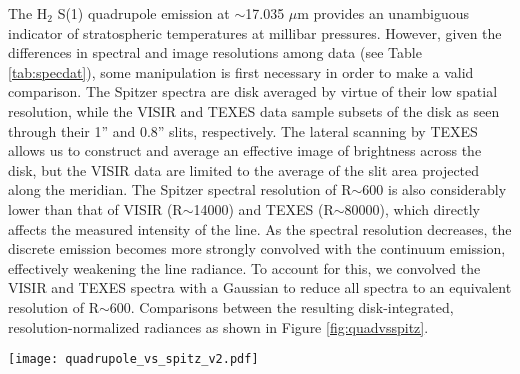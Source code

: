 \documentclass[twocolumn,10pt]{aastex631}
\begin{document}
The H$_2$ S(1) quadrupole emission at $\sim$17.035 $\mu$m provides an unambiguous indicator of stratospheric temperatures at millibar pressures.  However, given the differences in spectral and image resolutions among data (see Table \ref{tab:specdat}), some manipulation is first necessary in order to make a valid comparison. The Spitzer spectra are disk averaged by virtue of their low spatial resolution, while the VISIR and TEXES data sample subsets of the disk as seen through their 1'' and 0.8'' slits, respectively. The lateral scanning by TEXES allows us to construct and average an effective image of brightness across the disk, but the VISIR data are limited to the average of the slit area projected along the meridian. The Spitzer spectral resolution of R$\sim$600 is also considerably lower than that of VISIR (R$\sim$14000) and TEXES (R$\sim$80000), which directly affects the measured intensity of the line. As the spectral resolution decreases, the discrete emission becomes more strongly convolved with the continuum emission, effectively weakening the line radiance.  To account for this, we convolved the VISIR and TEXES spectra with a Gaussian to reduce all spectra to an equivalent  resolution of R$\sim$600.  Comparisons between the resulting disk-integrated, resolution-normalized radiances as shown in Figure \ref{fig:quadvsspitz}.  

\begin{figure*}[hb]
    \centering
    \texttt{[image: quadrupole\_vs\_spitz\_v2.pdf]}
    \caption{Comparison of the H$_2$ S(1) emission line from different instruments and times, as listed in Table \ref{tab:specdat}. (Left panel) The 2006 VISIR data (gold lines) are shown for three different assumptions regarding calibration: first, as flux calibrated with no correction (dotted gold line), and then corrected so that the continuum radiances match Spitzer, equally accomplished by subtracting $6.3\times 10^{-9}$ W/cm$^2$/sr/$\mu$m (dashed gold line) or dividing by a factor of 1.385 (solid gold line).  VISIR and TEXES spectra were reduced to a resolution of R$\sim$600 from intrinsic resolutions of R$\sim$14000 and R$\sim$80000, respectively, to match Spitzer-IRS, and all were shifted to an averaged central wavelength of 17.03 $\mu$m.  Error bars express an uncertainty of 15$\%$ for TEXES and VISIR data. Spitzer measurements have an uncertainty of $6\%$, with error bars omitted for clarity. (Right panel) Corresponding disk radiances ratioed to the Spitzer 2005 value, including the two plausible values of VISIR (filled and open circles corresponding to the solid and dashed curves, respectively), show a clear decrease over time. }
    \label{fig:quadvsspitz}
\end{figure*}
\end{document}
